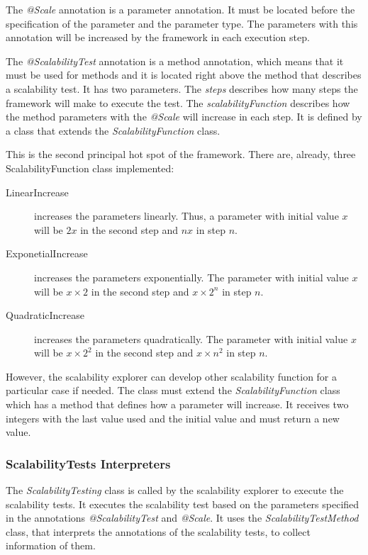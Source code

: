 The \emph{@Scale} annotation is a parameter annotation. It must be located before the specification of the parameter and the parameter type. The parameters with this annotation will be increased by the framework in each execution step.

The \emph{@ScalabilityTest} annotation is a method annotation, which means that it must be used for methods and it is located right above the method that describes a scalability test. It has two parameters. The \emph{steps} describes how many steps the framework will make to execute the test. The \emph{scalabilityFunction} describes how the method parameters with the \emph{@Scale} will increase in each step. It is defined by a class that extends the \emph{ScalabilityFunction} class.

This is the second principal hot spot of the framework. There are, already, three ScalabilityFunction class implemented:
\begin{description}
\item[LinearIncrease] increases the parameters linearly. Thus, a parameter with initial value $x$ will be $2x$ in the second step and $nx$ in step $n$.
\item[ExponetialIncrease] increases the parameters exponentially. The parameter with initial value $x$ will be $x \times 2$ in the second step and $x \times 2^n$ in step $n$.
\item[QuadraticIncrease] increases the parameters quadratically. The parameter with initial value $x$ will be $x \times 2^2$ in the second step and $x \times n^2$ in step $n$.
\end{description}

However, the scalability explorer can develop other scalability function for a particular case if needed. The class must extend the \emph{ScalabilityFunction} class which has a method that defines how a parameter will increase. It receives two integers with the last value used and the initial value and must return a new value.

\subsubsection{ScalabilityTests Interpreters}
The \emph{ScalabilityTesting} class is called by the scalability explorer to execute the scalability tests. It executes the scalability test based on the parameters specified in the annotations \emph{@ScalabilityTest} and \emph{@Scale}. It uses the \emph{ScalabilityTestMethod} class, that interprets the annotations of the scalability tests, to collect information of them.

